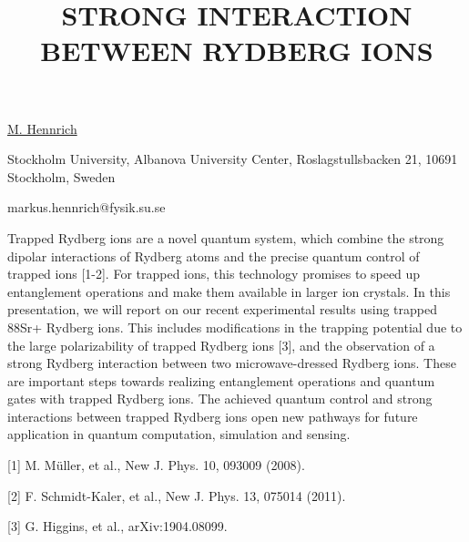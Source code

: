 \title{STRONG INTERACTION BETWEEN RYDBERG IONS}

\underline{M. Hennrich}  

{\normalsize{\vspace{-4mm}
Stockholm University,
Albanova University Center,
Roslagstullsbacken 21,
10691 Stockholm,
Sweden



\email markus.hennrich@fysik.su.se}}

Trapped Rydberg ions are a novel quantum system, which combine the strong dipolar interactions of Rydberg atoms and the precise quantum control of trapped ions [1-2]. For trapped ions, this technology promises to speed up entanglement operations and make them available in larger ion crystals.
In this presentation, we will report on our recent experimental results using trapped 88Sr+ Rydberg ions.  This includes modifications in the trapping potential due to the large polarizability of trapped Rydberg ions [3], and the observation of a strong Rydberg interaction between two microwave-dressed Rydberg ions. These are important steps towards realizing entanglement operations and quantum gates with trapped Rydberg ions.
The achieved quantum control and strong interactions between trapped Rydberg ions open new pathways for future application in quantum computation, simulation and sensing.      

{\normalsize
[1] M. M\"uller, et al., New J. Phys. 10, 093009 (2008).
\vsp

[2] F. Schmidt-Kaler, et al., New J. Phys. 13, 075014 (2011).
\vsp

[3] G. Higgins, et al., arXiv:1904.08099.
}

\vspace{\baselineskip}
